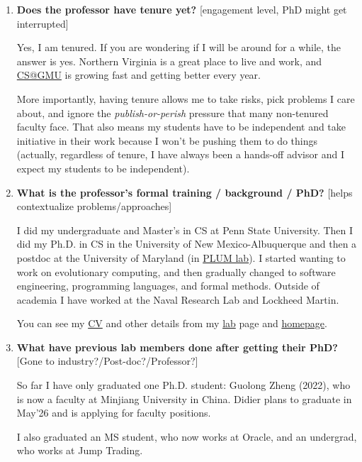\documentclass{article}
\begin{document}
\begin{enumerate}[label=\arabic*.]
    \item \textbf{Does the professor have tenure yet?} [engagement level, PhD might get interrupted]  
    
    Yes, I am tenured. If you are wondering if I will be around for a while, the answer is yes. Northern Virginia is a great place to live and work, and \href{https://realgmucs.github.io/stats}{CS@GMU} is growing fast and getting better every year.
    
    More importantly, having tenure allows me to take risks, pick problems I care about, and ignore the \textit{publish-or-perish} pressure that many non-tenured faculty face. That also means my students have to be independent and take initiative in their work because I won't be pushing them to do things (actually, regardless of tenure, I have always been a hands-off advisor and I expect my students to be independent).

    \item \textbf{What is the professor's formal training / background / PhD?} [helps contextualize problems/approaches]  
    
    I did my undergraduate and Master's in CS at Penn State University. Then I did my Ph.D. in CS in the University of New Mexico-Albuquerque and then a postdoc at the University of Maryland (in \href{https://plum-umd.github.io}{PLUM lab}). I started wanting to work on evolutionary computing, and then gradually changed to software engineering, programming languages, and formal methods.  Outside of academia I have worked at the Naval Research Lab and Lockheed Martin. 

    You can see my \href{https://raw.githubusercontent.com/dynaroars/latex-cv/main/cv.pdf}{CV} and other details from my \href{https://roars.dev}{lab} page and \href{https://tvn.roars.dev}{homepage}.

    \item \textbf{What have previous lab members done after getting their PhD?} [Gone to industry?/Post-doc?/Professor?]  
    
    So far I have only graduated one Ph.D. student: Guolong Zheng (2022), who is now a faculty at Minjiang University in China. Didier plans to graduate in May'26 and is applying for faculty positions.  
    
    I also graduated an MS student, who now works at Oracle, and an undergrad, who works at Jump Trading.
\end{enumerate}
\end{document}
